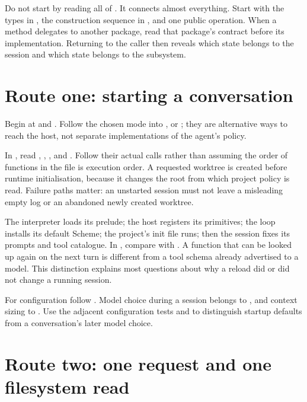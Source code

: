 Do not start by reading all of . It connects almost everything.
Start with the types in , the construction
sequence in , and one public operation.
When a method delegates to another package, read that package's contract
before its implementation. Returning to the caller then reveals which
state belongs to the session and which state belongs to the subsystem.

\section{Route one: starting a conversation}

Begin at  and . Follow the
chosen mode into ,  or
; they are alternative ways to reach the host,
not separate implementations of the agent's policy.

In , read , ,
,  and . Follow their actual
calls rather than assuming the order of functions in the file is execution
order. A requested worktree is created before runtime initialisation,
because it changes the root from which project policy is read. Failure
paths matter: an unstarted session must not leave a misleading empty log
or an abandoned newly created worktree.

The interpreter loads its prelude; the host registers its primitives; the
loop installs its default Scheme; the project's init file runs; then the
session fixes its prompts and tool catalogue. In
, compare  with . A
function that can be looked up again on the next turn is different from a
tool schema already advertised to a model. This distinction explains most
questions about why a reload did or did not change a running session.

For configuration follow .
Model choice during a session belongs to
, and context sizing to
. Use the adjacent configuration tests
and  to distinguish startup
defaults from a conversation's later model choice.

\section{Route two: one request and one filesystem read}

